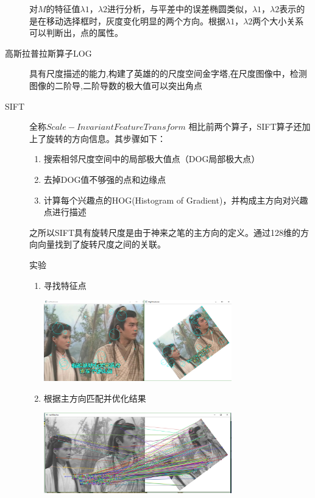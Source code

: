 \documentclass[a4paper,16pt,UTF8]{article}
\begin{document}
\begin{flushleft}
\begin{description}
        对$M$的特征值$\lambda1$，$\lambda2$进行分析，与平差中的误差椭圆类似，$\lambda1$，$\lambda2$表示的是在移动选择框时，灰度变化明显的两个方向。根据$\lambda1$，$\lambda2$两个大小关系可以判断出，点的属性。

        \item[高斯拉普拉斯算子LOG]

            具有尺度描述的能力,构建了英雄的的尺度空间金字塔,在尺度图像中，检测图像的二阶导,二阶导数的极大值可以突出角点

        \item[SIFT]

            全称$Scale-Invariant Feature Transform$
            相比前两个算子，SIFT算子还加上了旋转的方向信息。其步骤如下：
            \begin{enumerate}
                \item 搜索相邻尺度空间中的局部极大值点（DOG局部极大点）
                \item 去掉DOG值不够强的点和边缘点
                \item 计算每个兴趣点的HOG(Histogram of Gradient)，并构成主方向对兴趣点进行描述
            \end{enumerate}

            之所以SIFT具有旋转尺度是由于神来之笔的主方向的定义。通过128维的方向向量找到了旋转尺度之间的关联。

            实验
            \begin{enumerate}
                \item 寻找特征点

                \includegraphics[width = 0.7\textwidth]{sift01.jpg}

                \item 根据主方向匹配并优化结果

                \includegraphics[width = 0.7\textwidth]{sift02.jpg}


\end{enumerate}
\end{description}
\end{flushleft}
\end{document}
